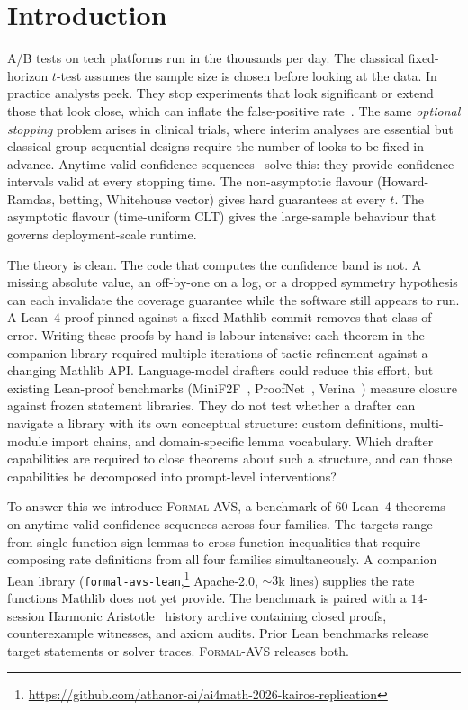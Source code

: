 \section{Introduction}
\label{sec:intro}

A/B tests on tech platforms run in the thousands per day. The classical
fixed-horizon $t$-test assumes the sample size is chosen before looking
at the data. In practice analysts peek. They stop experiments that
look significant or extend those that look close, which can
inflate the false-positive
rate~\cite{johari2017peeking}. The same
\emph{optional stopping} problem arises in clinical trials, where
interim analyses are essential but classical group-sequential designs
require the number of looks to be fixed in advance. Anytime-valid
confidence sequences~\cite{howard2021time,
waudbysmith2024estimating, whitehouse2025timeuniform} solve this:
they provide confidence intervals valid at every stopping time.
The non-asymptotic flavour (Howard-Ramdas, betting, Whitehouse vector)
gives hard guarantees at every $t$. The asymptotic flavour
(time-uniform CLT) gives the large-sample behaviour that governs
deployment-scale runtime.

The theory is clean. The code that computes the confidence band is not.
A missing absolute value, an off-by-one on a log, or a dropped
symmetry hypothesis can each invalidate the coverage guarantee while
the software still appears to run. A Lean~4 proof pinned against a
fixed Mathlib commit removes that class of error. Writing these proofs
by hand is labour-intensive: each theorem in the
companion library required multiple iterations of tactic
refinement against a changing Mathlib API. Language-model drafters could reduce this effort, but
existing Lean-proof benchmarks
(MiniF2F~\cite{zheng2022minif2f},
ProofNet~\cite{azerbayev2023proofnet}, Verina~\cite{sunblazeverina})
measure closure against frozen statement libraries. They do not test
whether a drafter can navigate a library with its own conceptual
structure: custom definitions, multi-module import chains, and
domain-specific lemma vocabulary. Which drafter capabilities are
required to close theorems about such a structure, and can those
capabilities be decomposed into prompt-level interventions?

To answer this we introduce \textsc{Formal-AVS}, a benchmark of
$60$ Lean~4 theorems on anytime-valid confidence sequences across
four families. The targets range from single-function sign lemmas to
cross-function inequalities that require composing rate definitions
from all four families simultaneously. A companion Lean library
(\texttt{formal-avs-lean},\footnote{\url{https://github.com/athanor-ai/ai4math-2026-kairos-replication}} Apache-2.0, ${\sim}3$k lines)
supplies the rate functions Mathlib does not yet provide.
The benchmark is paired with a $14$-session Harmonic
Aristotle~\cite{aristotle2025} history archive containing closed
proofs, counterexample witnesses, and axiom audits. Prior Lean
benchmarks release target statements or solver traces.
\textsc{Formal-AVS} releases both.

